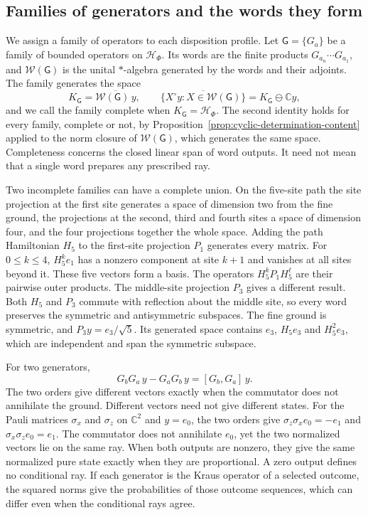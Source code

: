 \documentclass[11pt]{article}
\theoremstyle{definition}
\newcommand{\C}{\mathbb C}
\begin{document}
\subsection{Families of generators and the words they form}
\label{subsec:generator-families}

We assign a family of operators to each disposition profile. Let $\mathsf G=\{G_a\}$ be a family of bounded operators on $\mathcal H_\Phi$. Its words are the finite products $G_{a_n}\cdots G_{a_1}$, and $\mathcal W(\mathsf G)$ is the unital $*$-algebra generated by the words and their adjoints. The family generates the space
\begin{equation}
 K_{\mathsf G}=\overline{\mathcal W(\mathsf G)\,y},\qquad
 \overline{\{X^\circ y:X\in\mathcal W(\mathsf G)\}}=K_{\mathsf G}\ominus\C y ,
 \label{eq:family-generated-space}
\end{equation}
and we call the family complete when $K_{\mathsf G}=\mathcal H_\Phi$. The second identity holds for every family, complete or not, by Proposition~\ref{prop:cyclic-determination-content} applied to the norm closure of $\mathcal W(\mathsf G)$, which generates the same space. Completeness concerns the closed linear span of word outputs. It need not mean that a single word prepares any prescribed ray.

Two incomplete families can have a complete union. On the five-site path the site projection at the first site generates a space of dimension two from the fine ground, the projections at the second, third and fourth sites a space of dimension four, and the four projections together the whole space. Adding the path Hamiltonian $H_5$ to the first-site projection $P_1$ generates every matrix. For $0\leq k\leq4$, $H_5^k e_1$ has a nonzero component at site $k+1$ and vanishes at all sites beyond it. These five vectors form a basis. The operators $H_5^k P_1 H_5^\ell$ are their pairwise outer products. The middle-site projection $P_3$ gives a different result. Both $H_5$ and $P_3$ commute with reflection about the middle site, so every word preserves the symmetric and antisymmetric subspaces. The fine ground is symmetric, and $P_3y=e_3/\sqrt5$. Its generated space contains $e_3$, $H_5e_3$ and $H_5^2e_3$, which are independent and span the symmetric subspace.

For two generators,
\begin{equation}
 G_bG_a\,y-G_aG_b\,y=[G_b,G_a]\,y .
 \label{eq:word-order}
\end{equation}
The two orders give different vectors exactly when the commutator does not annihilate the ground. Different vectors need not give different states. For the Pauli matrices $\sigma_x$ and $\sigma_z$ on $\C^2$ and $y=e_0$, the two orders give $\sigma_z\sigma_xe_0=-e_1$ and $\sigma_x\sigma_ze_0=e_1$. The commutator does not annihilate $e_0$, yet the two normalized vectors lie on the same ray. When both outputs are nonzero, they give the same normalized pure state exactly when they are proportional. A zero output defines no conditional ray. If each generator is the Kraus operator of a selected outcome, the squared norms give the probabilities of those outcome sequences, which can differ even when the conditional rays agree.
\end{document}
